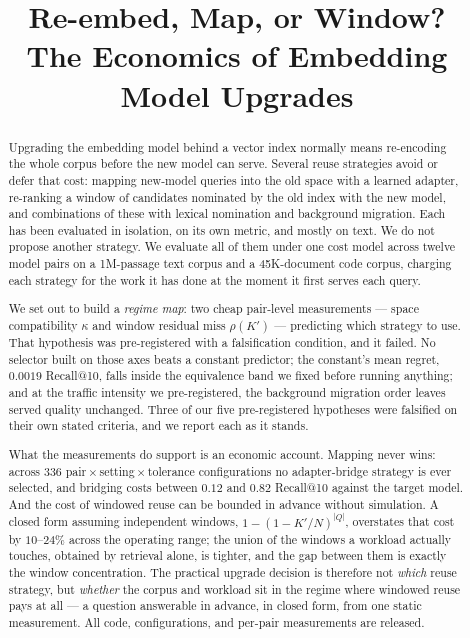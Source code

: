 \documentclass[conference]{IEEEtran}
\begin{document}
\title{Re-embed, Map, or Window?\\The Economics of Embedding Model Upgrades}

\author{
}

\maketitle

\begin{abstract}
Upgrading the embedding model behind a vector index normally means re-encoding the
whole corpus before the new model can serve. Several reuse strategies avoid or defer
that cost: mapping new-model queries into the old space with a learned adapter,
re-ranking a window of candidates nominated by the old index with the new model, and
combinations of these with lexical nomination and background migration. Each has been
evaluated in isolation, on its own metric, and mostly on text. We do not propose
another strategy. We evaluate all of them under one cost model across twelve model
pairs on a 1M-passage text corpus and a 45K-document code corpus, charging each
strategy for the work it has done at the moment it first serves each query.

We set out to build a \emph{regime map}: two cheap pair-level measurements --- space
compatibility $\kappa$ and window residual miss $\rho(K')$ --- predicting which
strategy to use. That hypothesis was pre-registered with a falsification condition, and
it failed. No selector built on those axes beats a constant predictor; the constant's
mean regret, $0.0019$ Recall@10, falls inside the equivalence band we fixed before
running anything; and at the traffic intensity we pre-registered, the background migration
order leaves served quality unchanged. Three of our five pre-registered hypotheses were
falsified on their own stated criteria, and we report each as it stands.

What the measurements do support is an economic account. Mapping never wins: across
336 pair\,$\times$\,setting\,$\times$\,tolerance configurations no adapter-bridge
strategy is ever selected, and bridging costs between $0.12$ and $0.82$ Recall@10
against the target model. And the cost of windowed reuse can be bounded in advance without
simulation. A closed form assuming independent windows, $1 - (1 - K'/N)^{|Q|}$, overstates
that cost by $10$--$24\%$ across the operating range; the union of the windows a workload
actually touches, obtained by retrieval alone, is tighter, and the gap between them is exactly
the window concentration. The practical upgrade decision is therefore not \emph{which}
reuse strategy, but \emph{whether} the corpus and workload sit in the regime where
windowed reuse pays at all --- a question answerable in advance, in closed form, from
one static measurement.
All code, configurations, and per-pair measurements are released.
\end{abstract}
\end{document}
